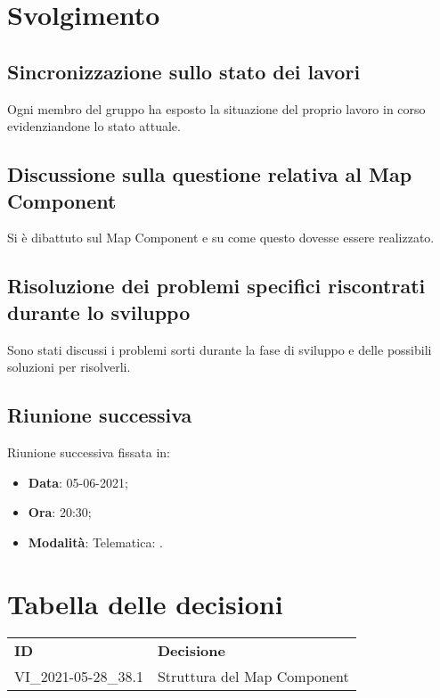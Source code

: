 \documentclass[]{article}
\begin{document}
	\newpage

	\section{Svolgimento}
		\subsection{Sincronizzazione sullo stato dei lavori}
		Ogni membro del gruppo ha esposto la situazione del proprio lavoro in corso evidenziandone lo stato attuale.\\

		\subsection{Discussione sulla questione relativa al Map Component}
		Si è dibattuto sul Map Component e su come questo dovesse essere realizzato.\\

		\subsection{Risoluzione dei problemi specifici riscontrati durante lo sviluppo}
		Sono stati discussi i problemi sorti durante la fase di sviluppo e delle possibili soluzioni per risolverli.\\

		\subsection{Riunione successiva}
		Riunione successiva fissata in:
		\begin{itemize}
			\item \textbf{Data}: 05-06-2021;
			\item \textbf{Ora}: 20:30;
			\item \textbf{Modalità}: Telematica: .
		\end{itemize}


\section{Tabella delle decisioni}

\begin{table} [h!]
	\begin{center}
		\begin{tabular} { m{2cm} m{14cm} }
			\rowcolor{lightgray}
			\textbf{ID} & \textbf{Decisione}\\
			VI\_2021-05-28\_38.1 & Struttura del Map Component \glock{Typescript}\\
		\end{tabular}
	\end{center}
\end{table}
\end{document}
